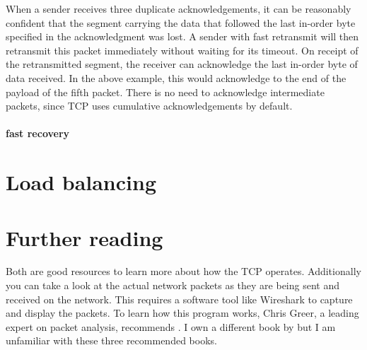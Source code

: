\begin{extrainfo}
When a sender receives three duplicate acknowledgements, it can be reasonably confident that the segment carrying the data that followed the last in-order byte specified in the acknowledgment was lost. 
A sender with fast retransmit will then retransmit this packet immediately without waiting for its timeout.
On receipt of the retransmitted segment, the receiver can acknowledge the last in-order byte of data received.
In the above example, this would acknowledge to the end of the payload of the fifth packet.
There is no need to acknowledge intermediate packets, since \acs{TCP} uses cumulative acknowledgements by default.

\paragraph{fast recovery}\leavevmode
\end{extrainfo}


\section{Load balancing}

\section{Further reading}
Both \textcite{stevens,comer} are good resources to learn more about how the \acf{TCP} operates.
Additionally you can take a look at the actual network packets as they are being sent and received on the network.
This requires a software tool like Wireshark to capture and display the packets.%
To learn how this program works, Chris Greer, a leading expert on packet analysis, recommends \textcite{chappell17,sanders,bock}.
I own a different book by \citeauthor{chappell17} but I am unfamiliar with these three recommended books.

